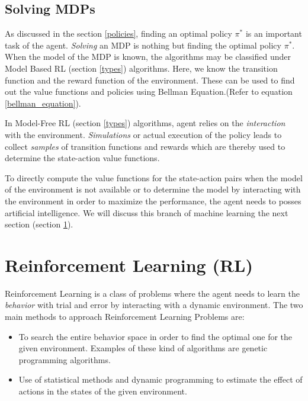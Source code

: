 \documentclass[12pt]{report}
\begin{document}
\subsection{Solving MDPs}
\label{bellman}
As discussed in the section \ref{policies}, finding an optimal policy $\pi^*$ is an important task of the agent. \textit{Solving} an MDP is nothing but finding the optimal policy $\pi^*$. When the model of the MDP is known, the algorithms may be classified under Model Based RL (section \ref{types}) algorithms. Here, we know the transition function and the reward function of the environment. These can be used to find out the value functions and policies using Bellman Equation.(Refer to equation \ref{bellman_equation}).\par 
In Model-Free RL (section \ref{types}) algorithms, agent relies on the \textit{interaction} with the environment. \textit{Simulations} or actual execution of the policy leads to collect \textit{samples} of transition functions and rewards which are thereby used to determine the state-action value functions.\par 
To directly compute the value functions for the state-action pairs when the model of the environment is not available or to determine the model by interacting with the environment in order to maximize the performance, the agent needs to posses artificial intelligence. We will discuss this branch of machine learning the next section (section \ref{rl}).

\section{Reinforcement Learning (RL)}
\label{rl}
Reinforcement Learning is a class of problems where the agent needs to learn the \textit{behavior} with trial and error by interacting with a dynamic environment. The two main methods to approach Reinforcement Learning Problems are:
\begin{itemize}
\item To search the entire behavior space in order to find the optimal one for the given environment. Examples of these kind of algorithms are genetic programming algorithms.
\item Use of statistical methods and dynamic programming to estimate the effect of actions in the states of the given environment. \cite{kaelbling1996reinforcement}
\end{itemize}
\end{document}
